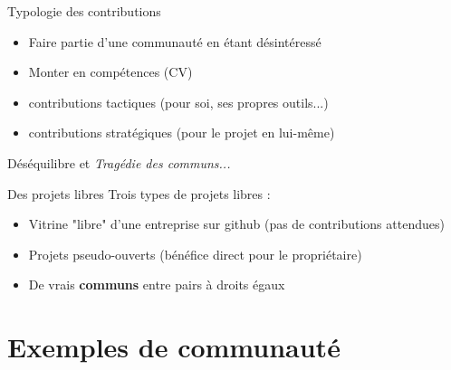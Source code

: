 \documentclass{beamer}
\begin{document}
\begin{frame}{Typologie des contributions}

  \begin{itemize}
  \item Faire partie d'une communauté en étant désintéressé
  \item Monter en compétences (CV)
  \item contributions tactiques (pour soi, ses propres outils...)
  \item contributions stratégiques (pour le projet en lui-même)
  \end{itemize}

  Déséquilibre et \textit{Tragédie des communs...}

  
\end{frame}

\begin{frame}{Des projets libres}
  Trois types de projets libres :
  \begin{itemize}
  \item Vitrine "libre" d'une entreprise sur github (pas de contributions attendues)
  \item Projets pseudo-ouverts (bénéfice direct pour le propriétaire)
  \item De vrais \textbf{communs} entre pairs à droits égaux
  \end{itemize}
\end{frame}

\section{Exemples de communauté}
\end{document}
